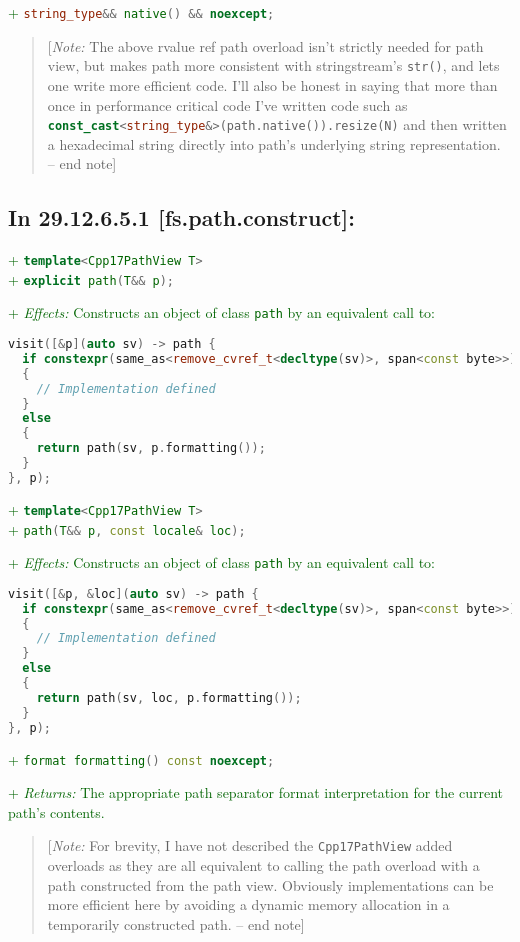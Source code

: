 \documentclass[11pt]{article}
\newcommand{\code}[2][cpp]{\lstinline[language=#1,basicstyle=\small\ttfamily]{#2}}
\newcommand{\desc}[1]{\textit{#1}}
\newcommand{\effects}{\desc{Effects: }}
\newcommand{\returns}{\desc{Returns: }}
\newcommand{\note}[1]{\begin{quote}[\textit{Note:} #1 -- end note]\end{quote}}
\newcommand{\tsref}[2]{\subsection*{In #2 \textbf{[#1]}:}}
\newcommand{\tsreplace}[3]{\textcolor{red}{\sout{#1}}#2\textcolor{darkgreen}{#3}}
\begin{document}
\tsreplace{}{}{+ \code{string_type&& native() && noexcept;}}

\note{The above rvalue ref path overload isn't strictly needed for path view, but makes path more consistent with stringstream's \code{str()}, and lets one write more efficient code. I'll also be honest in saying that more than once in performance critical code I've written code such as \code{const_cast<string_type&>(path.native()).resize(N)} and then written a hexadecimal string directly into path's underlying string representation.}


\tsref{fs.path.construct}{29.12.6.5.1}

\tsreplace{}{}{+ \code{template<Cpp17PathView T>}}\\
\tsreplace{}{}{+ \code{explicit path(T&& p);}}

\tsreplace{}{}{+ \effects Constructs an object of class \code{path} by an equivalent call to:}
\begin{lstlisting}[language=cpp]
visit([&p](auto sv) -> path {
  if constexpr(same_as<remove_cvref_t<decltype(sv)>, span<const byte>>)
  {
    // Implementation defined
  }
  else
  {
    return path(sv, p.formatting());
  }
}, p);
\end{lstlisting}

\tsreplace{}{}{+ \code{template<Cpp17PathView T>}}\\
\tsreplace{}{}{+ \code{path(T&& p, const locale& loc);}}

\tsreplace{}{}{+ \effects Constructs an object of class \code{path} by an equivalent call to:}
\begin{lstlisting}[language=cpp]
visit([&p, &loc](auto sv) -> path {
  if constexpr(same_as<remove_cvref_t<decltype(sv)>, span<const byte>>)
  {
    // Implementation defined
  }
  else
  {
    return path(sv, loc, p.formatting());
  }
}, p);
\end{lstlisting}

\tsreplace{}{}{+ \code{format formatting() const noexcept;}}

\tsreplace{}{}{+ \returns The appropriate path separator format interpretation for the current path's contents.}

\note{For brevity, I have not described the \code{Cpp17PathView} added overloads as they are all equivalent to calling the path overload with a path constructed from the path view. Obviously implementations can be more efficient here by avoiding a dynamic memory allocation in a temporarily constructed path.}

\color{darkgreen}
\end{document}
